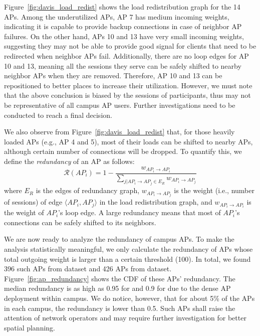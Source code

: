 Figure~\ref{fig:davis_load_redist} shows the load redistribution graph for the
14 APs. Among the underutilized APs, AP 7 has medium 
incoming weights, indicating it is capable to provide backup connections
in case of neighbor AP failures. On the other hand, APs 10 and 13 have very small incoming
weights, suggesting they may not be able to provide good signal for clients
that need to be redirected when neighbor APs fail. Additionally, there are no loop edges for
AP 10 and 13, meaning all the \wifi{} sessions they serve can be safely shifted to
nearby neighbor APs when they are removed. Therefore, AP 10 and 13 can be
repositioned to better places to increase their utilization. However, we must
note that the above conclusion is biased by the \wifi{} sessions of \PhoneLab{}
participants, thus may not be representative of all campus AP users. Further
investigations need to be conducted to reach a final decision.

We also observe from Figure~\ref{fig:davis_load_redist} that, for those heavily
loaded APs (e.g., AP 4 and 5), most of their loads can be shifted to nearby APs,
although certain number of connections will be dropped. To quantify this, we define the
\textit{redundancy} of an AP as follows:%
\begin{equation}
  \mathcal{R}(AP_i) = 1 - \frac{w_{AP_i \rightarrow AP_i}}{\sum_{j|AP_i \rightarrow
    AP_j \in E_R} w_{AP_i \rightarrow AP_j}}
\end{equation}%
where $E_R$ is the edges of redundancy graph, $w_{AP_i \rightarrow AP_j}$ is the
weight (i.e., number of sessions) of edge $\langle AP_i, AP_j\rangle$ in the
load redistribution graph, and $w_{AP_i \rightarrow AP_i}$ is the weight of
$AP_i$'s loop edge. A large redundancy means that most of $AP_i$'s connections
can be safely shifted to its neighbors.

We are now ready to analyze the redundancy of campus APs. To make the analysis
statistically meaningful, we only calculate the redundancy of APs whose total
outgoing weight is larger than a certain threshold (100). In total, we found
396 such APs from \ubscan{} dataset and 426 APs from \ndscan{} dataset.
Figure~\ref{fig:ap_redundancy} shows the CDF of these APs' redundancy. The
median redundancy is as high as 0.95 for \ub{} and 0.9 for \nd{} due to the dense AP
deployment within campus. We do notice, however, that for about 5\% of the APs in
each campus, the redundancy is lower than 0.5. Such APs shall raise the attention of network
operators and may require further investigation for better spatial planning.


